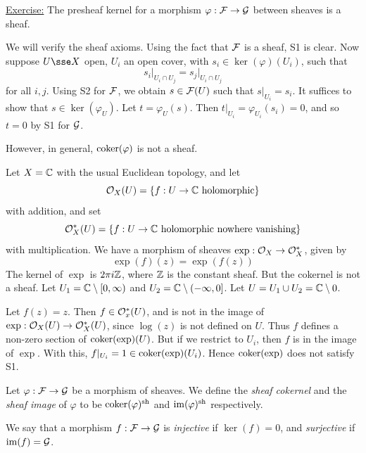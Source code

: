 \documentclass{article}
\begin{document}
\underline{Exercise:} The presheaf kernel for a morphism \(\varphi : \mathcal{F} \to \mathcal{G}\) between sheaves is a sheaf. \begin{addendum}
    We will verify the sheaf axioms. Using the fact that \(\mathcal{F}\) is a sheaf, S1 is clear. Now suppose \(U \sse X\) open, \(U_i\) an open cover, with \(s_i \in \ker(\varphi)(U_i)\), such that
    \[s_i \vert_{U_i \cap U_j} = s_j\vert_{U_i \cap U_j}\]
    for all \(i, j\). Using S2 for \(\mathcal{F}\), we obtain \(s \in \mathcal{F}(U)\) such that \(s \vert_{U_i} = s_i\). It suffices to show that \(s \in \ker(\varphi_U)\). Let \(t = \varphi_U(s)\). Then \(t \vert_{U_i} = \varphi_{U_i}(s_i) = 0\), and so \(t = 0\) by S1 for \(\mathcal{G}\).
\end{addendum}

However, in general, \(\operatorname{coker}(\varphi)\) is not a sheaf.

\begin{example}
    Let \(X = \mathbb{C}\) with the usual Euclidean topology, and let
    \[\mathcal{O}_X(U) = \left\{f : U \to \mathbb{C} \text{ holomorphic}\right\}\]
    with addition, and set
    \[\mathcal{O}_X^*(U) = \left\{f : U \to \mathbb{C} \text{ holomorphic nowhere vanishing}\right\}\]
    with multiplication. We have a morphism of sheaves \(\exp : \mathcal{O}_X \to \mathcal{O}_X^*\), given by
    \[\exp(f)(z) = \exp(f(z))\]
    The kernel of \(\exp\) is \(2\pi i \mathbb{Z}\), where \(\mathbb{Z}\) is the constant sheaf. But the cokernel is not a sheaf. Let \(U_1 = \mathbb{C} \setminus [0, \infty)\) and \(U_2 = \mathbb{C} \setminus (-\infty, 0]\). Let \(U = U_1 \cup U_2 = \mathbb{C} \setminus 0\).

    Let \(f(z) = z\). Then \(f \in \mathcal{O}_x^*(U)\), and is not in the image of \(\exp : \mathcal{O}_X(U) \to \mathcal{O}_X^*(U)\), since \(\log(z)\) is not defined on \(U\). Thus \(f\) defines a non-zero section of \(\operatorname{coker}(\exp)(U)\). But if we restrict to \(U_i\), then \(f\) is in the image of \(\exp\). With this, \(f\vert_{U_i} = 1 \in \operatorname{coker}(\exp)(U_i)\). Hence \(\operatorname{coker}(\exp)\) does not satisfy S1.
\end{example}

\begin{definition}
    Let \(\varphi : \mathcal{F} \to \mathcal{G}\) be a morphism of sheaves. We define the \emph{sheaf cokernel} and the \emph{sheaf image} of \(\varphi\) to be \(\operatorname{coker}(\varphi)^{\operatorname{sh}}\) and \(\operatorname{im}(\varphi)^{\operatorname{sh}}\) respectively.
\end{definition}

We say that a morphism \(f : \mathcal{F} \to \mathcal{G}\) is \emph{injective} if \(\ker(f) = 0\), and \emph{surjective} if \(\operatorname{im}(f) = \mathcal{G}\).
\end{document}
